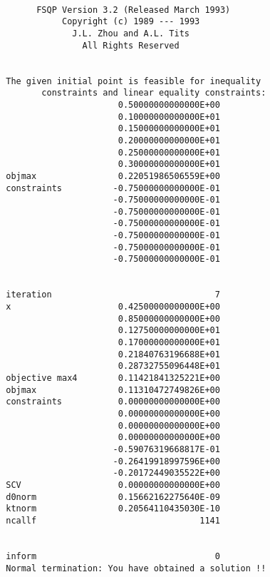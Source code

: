 \begin{verbatim}

                    FSQP Version 3.2 (Released March 1993)    
                         Copyright (c) 1989 --- 1993          
                           J.L. Zhou and A.L. Tits    
                             All Rights Reserved              
             
             
              The given initial point is feasible for inequality
                     constraints and linear equality constraints:
                                    0.50000000000000E+00
                                    0.10000000000000E+01
                                    0.15000000000000E+01
                                    0.20000000000000E+01
                                    0.25000000000000E+01
                                    0.30000000000000E+01
              objmax                0.22051986506559E+00
              constraints          -0.75000000000000E-01
                                   -0.75000000000000E-01
                                   -0.75000000000000E-01
                                   -0.75000000000000E-01
                                   -0.75000000000000E-01
                                   -0.75000000000000E-01
                                   -0.75000000000000E-01

                 
              iteration                                7
              x                     0.42500000000000E+00
                                    0.85000000000000E+00
                                    0.12750000000000E+01
                                    0.17000000000000E+01
                                    0.21840763196688E+01
                                    0.28732755096448E+01
              objective max4        0.11421841325221E+00
              objmax                0.11310472749826E+00
              constraints           0.00000000000000E+00
                                    0.00000000000000E+00
                                    0.00000000000000E+00
                                    0.00000000000000E+00
                                   -0.59076319668817E-01
                                   -0.26419918997596E+00
                                   -0.20172449035522E+00
              SCV                   0.00000000000000E+00
              d0norm                0.15662162275640E-09
              ktnorm                0.20564110435030E-10
              ncallf                                1141
             
             
              inform                                   0
              Normal termination: You have obtained a solution !!
\end{verbatim}

